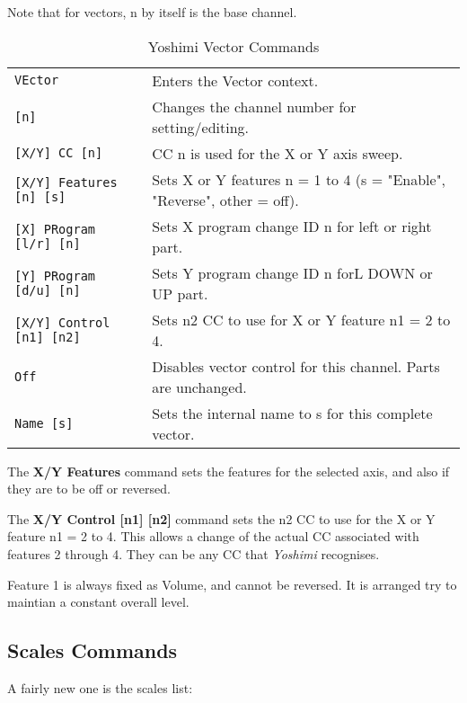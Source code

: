    Note that for vectors, n by itself is the base channel.

   \begin{table}[H]
      \centering
      \caption{Yoshimi Vector Commands}
      \label{table:yoshimi_text_vector_commands}
      \begin{tabular}{l l}

\texttt{VEctor} &
   Enters the Vector context. \\
   \texttt{[n]} &
   Changes the channel number for setting/editing.\\
\texttt{[X/Y] CC [n]} &
   CC n is used for the X or Y axis sweep. \\
\texttt{[X/Y] Features [n] [s]} &
   Sets X or Y features n = 1 to 4 (s = "Enable", "Reverse", other = off).  \\
\texttt{[X] PRogram [l/r] [n]} &
   Sets X program change ID n for left or right part. \\
\texttt{[Y] PRogram [d/u] [n]} &
   Sets Y program change ID n forL DOWN or UP part. \\
\texttt{[X/Y] Control [n1] [n2]} &
   Sets n2 CC to use for X or Y feature n1 = 2 to 4. \\
\texttt{Off} &
   Disables vector control for this channel.  Parts are unchanged. \\
\texttt{Name [s]} &
   Sets the internal name to s for this complete vector.  \\

      \end{tabular}
   \end{table}

   The \textbf{X/Y Features} command sets the features for the
   selected axis, and also if they are to be off or reversed.

   The \textbf{X/Y Control [n1] [n2]} command
   sets the n2 CC to use for the X or Y feature n1 = 2 to 4.
   This allows a change of the actual CC associated with features 2 through 4.
   They can be any CC that \textsl{Yoshimi} recognises.

   Feature 1 is always fixed as Volume, and cannot be reversed. It is arranged
   try to maintian a constant overall level.

\subsection{Scales Commands}
\label{subsec:command_line_scales_command_list}

   A fairly new one is the scales list:

